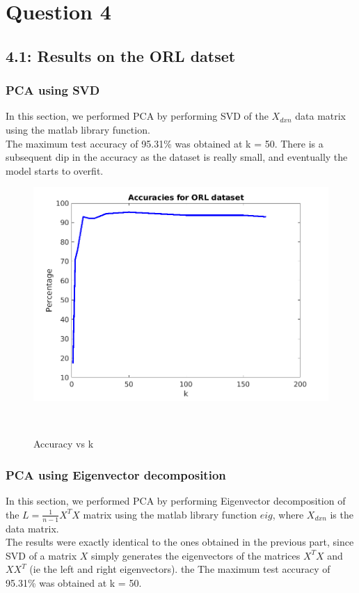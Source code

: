 \documentclass[12pt, a4paper]{article}
\begin{document}
\vspace*{-22pt}
\section*{Question 4}
\subsection*{4.1: Results on the ORL datset}
\subsubsection*{PCA using SVD}
\quad In this section, we performed PCA by performing SVD of the $X_{dxn}$ data matrix using the matlab library function. \\
The maximum test accuracy of 95.31\% was obtained at k = 50. There is a subsequent dip in the accuracy as the dataset is really small, and eventually the model starts to overfit.

\begin{figure}[h!]
    \centering
    \renewcommand{\thefigure}{4.1}
    \begin{minipage}[c][1\width]{0.4\textwidth}
    	\hspace*{-0.5in}
    	\includegraphics[width=1.34\textwidth]{orl.png}
    	\null\vspace*{-28pt}
    	\caption{Accuracy vs k}
	    \label{fig:4.1}
    \end{minipage} \\
\end{figure}
\vspace*{-24pt}
\subsubsection*{PCA using Eigenvector decomposition}
\quad In this section, we performed PCA by performing Eigenvector decomposition of the $L = \frac{1}{n-1}X^TX$ matrix using the matlab library function $eig$, where $X_{dxn}$ is the data matrix. \\
The results were exactly identical to the ones obtained in the previous part, since SVD of a matrix $X$ simply generates the eigenvectors of the matrices $X^TX$ and $XX^T$ (ie the left and right eigenvectors). the The maximum test accuracy of 95.31\% was obtained at k = 50.
\end{document}
